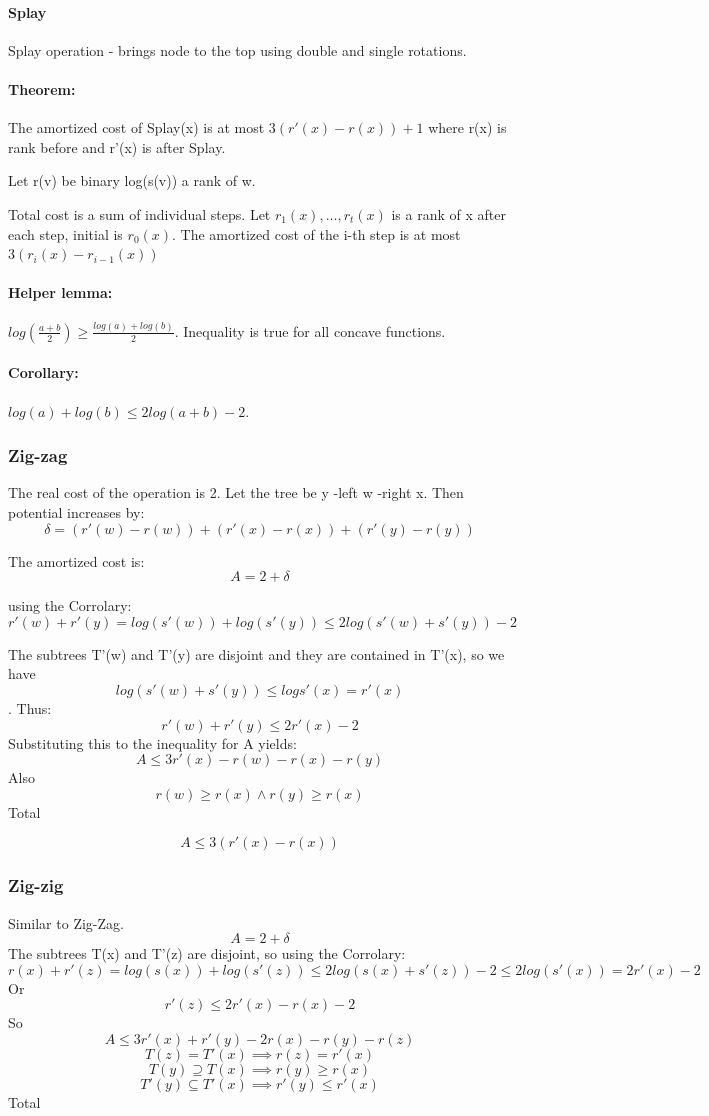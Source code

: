 \documentclass[12pt]{article}
\begin{document}
\paragraph{Splay}
Splay operation - brings node to the top using double and single rotations.

\paragraph{Theorem:} The amortized cost of Splay(x) is at most $ 3 (r'(x) - r(x)) + 1 $ where r(x) is rank before and r'(x) is after Splay.

Let r(v) be binary log(s(v)) a rank of w.

Total cost is a sum of individual steps. Let $ r_1(x), ..., r_t(x) $ is a rank of x after each step, initial is $ r_0(x) $.
The amortized cost of the i-th step is at most $ 3 (r_i(x) - r_{i-1}(x)) $

\paragraph{Helper lemma:}
$ log(\frac{a + b}{2}) \geq \frac{log(a) + log(b)}{2} $. Inequality is true for all concave functions.

\paragraph{Corollary:} $ log(a) + log(b) \leq 2log(a + b) - 2 $.

\subsubsection*{Zig-zag}
The real cost of the operation is 2. Let the tree be y -left w -right x. Then potential increases by:
\[ \delta = (r'(w) - r(w)) + (r'(x) - r(x)) + (r'(y) - r(y)) \]

The amortized cost is:
\[ A = 2 + \delta \]

using the Corrolary:
\[ r'(w) + r'(y) = log(s'(w)) + log(s'(y)) \leq 2log(s'(w) + s'(y)) - 2 \]

The subtrees T'(w) and T'(y) are disjoint and they are contained in T'(x), so we have
\[log(s'(w) + s'(y)) \leq log s'(x) = r'(x)\].
Thus:
\[ r'(w) + r'(y) \leq 2r'(x) - 2 \]
Substituting this to the inequality for A yields:
\[ A \leq 3r'(x) - r(w) - r(x) - r(y) \]
Also
\[ r(w) \geq r(x) \land r(y) \geq r(x) \]
Total

\[ A \leq 3(r'(x) - r(x)) \]

\subsubsection*{Zig-zig}
Similar to Zig-Zag.
\[ A = 2 + \delta \]
The subtrees T(x) and T'(z) are disjoint, so using the Corrolary:
\[ r(x) + r'(z) = log(s(x)) + log(s'(z)) \leq 2log(s(x) + s'(z)) - 2 \leq 2log(s'(x)) = 2r'(x) - 2 \]
Or
\[ r'(z) \leq 2r'(x) - r(x) - 2 \]
So
\[ A \leq 3r'(x) + r'(y) - 2r(x) - r(y) - r(z) \]
\[ T(z) = T'(x) \implies r(z) = r'(x) \]
\[ T(y) \supseteq T(x) \implies r(y) \geq r(x) \]
\[ T'(y) \subseteq T'(x) \implies r'(y) \leq r'(x) \]
Total
\end{document}
